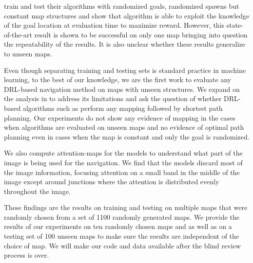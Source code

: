 \cite{MiPaViICLR2017} train and test their algorithms with randomized goals, randomized spawns but constant map structures and show that algorithm is able to exploit the knowledge of the goal location at evaluation time to maximize reward.
However, this state-of-the-art result is shown to be successful on only one map bringing into question the repeatability of the results.
It is also unclear whether these results generalize to unseen maps.

Even though separating training and testing sets is standard practice in machine learning, to the best of our knowledge, we are the first work to evaluate any DRL-based navigation method on maps with unseen structures.
We expand on the analysis in \cite{MiPaViICLR2017} to address its limitations and ask the question of whether DRL-based algorithms such as \NavAiiiCDiDiiL{} perform any mapping followed by shortest path planning.
Our experiments do not show any evidence of mapping in the cases when algorithms are evaluated on unseen maps and no evidence of optimal path planning even in cases when the map is constant and only the goal is randomized.

We also compute attention-maps for the models to understand what part of the image is being used for the navigation.
We find that the models discard most of the image information, focusing attention on a small band in the middle of the image except around junctions where the attention is distributed evenly throughout the image.

These findings are the results on training and testing on multiple maps that were randomly chosen from a set of 1100 randomly generated maps.
We provide the results of our experiments on ten randomly chosen maps and as well as on a testing set of 100 unseen maps to make sure the results are independent of the choice of map.
We will make our code and data available after the blind review process is over.




